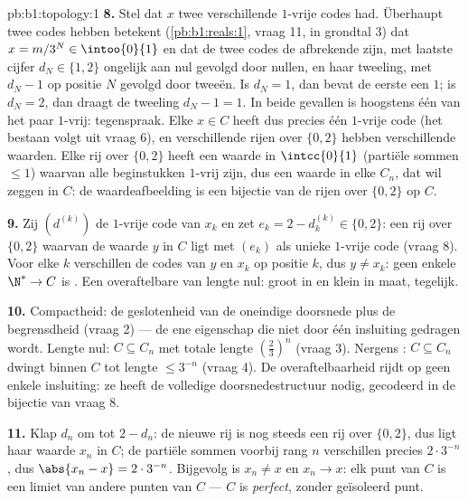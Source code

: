 \begin{solution}{pb:b1:topology:1}
\textbf{8.} Stel dat $x$ twee verschillende $1$-vrije codes had.
Überhaupt twee codes hebben betekent (\cref{pb:b1:reals:1}, vraag 11, in
grondtal $3$) dat $x = m/3^N \in \intoo{0}{1}$ en dat de twee codes de
afbrekende zijn, met laatste cijfer $d_N \in \{1, 2\}$ ongelijk aan nul
gevolgd door nullen, en haar tweeling, met $d_N - 1$ op positie $N$
gevolgd door tweeën. Is $d_N = 1$, dan bevat de eerste een $1$; is $d_N =
2$, dan draagt de tweeling $d_N - 1 = 1$. In beide gevallen is hoogstens
één van het paar $1$-vrij: tegenspraak. Elke $x \in C$ heeft dus precies
één $1$-vrije code (het bestaan volgt uit vraag 6), en verschillende
rijen over $\{0,2\}$ hebben verschillende waarden. Elke rij over
$\{0,2\}$ heeft een waarde in $\intcc{0}{1}$ (partiële sommen $\leq 1$)
waarvan alle beginstukken $1$-vrij zijn, dus een waarde in elke $C_n$,
dat wil zeggen in $C$: de waardeafbeelding is een bijectie van de rijen
over $\{0,2\}$ op $C$.

\textbf{9.} Zij $(d^{(k)})$ de $1$-vrije code van $x_k$ en zet $e_k = 2 -
d^{(k)}_k \in \{0, 2\}$: een rij over $\{0,2\}$ waarvan de waarde $y$ in
$C$ ligt met $(e_k)$ als unieke $1$-vrije code (vraag 8). Voor elke $k$
verschillen de codes van $y$ en $x_k$ op positie $k$, dus $y \neq x_k$:
geen enkele  $\N^* \to C$ is . Een overaftelbare
 van lengte nul: groot in  en klein in maat,
tegelijk.

\textbf{10.} Compactheid: de geslotenheid van de oneindige doorsnede plus
de begrensdheid (vraag 2) --- de ene eigenschap die niet door één
insluiting gedragen wordt. Lengte nul: $C \subseteq C_n$ met totale
lengte $(\frac23)^n$ (vraag 3). Nergens : $C \subseteq C_n$ dwingt
 binnen $C$ tot lengte $\leq 3^{-n}$ (vraag 4). De
overaftelbaarheid rijdt op geen enkele insluiting: ze heeft de volledige
doorsnedestructuur nodig, gecodeerd in de bijectie van vraag 8.

\textbf{11.} Klap $d_n$ om tot $2 - d_n$: de nieuwe rij is nog steeds een
rij over $\{0,2\}$, dus ligt haar waarde $x_n$ in $C$; de partiële sommen
voorbij rang $n$ verschillen precies $2\cdot3^{-n}$, dus $\abs{x_n - x} =
2\cdot3^{-n}$. Bijgevolg is $x_n \neq x$ en $x_n \to x$: elk punt van $C$
is een limiet van andere punten van $C$ --- $C$ is \emph{perfect}, zonder
geïsoleerd punt.


\end{solution}
